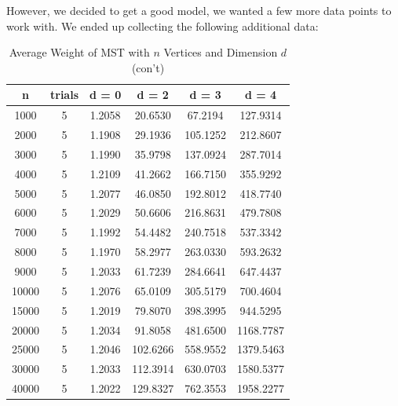 \documentclass[12pt]{article}
\begin{document}
However, we decided to get a good model, we wanted a few more data points to work with. We ended up collecting the following additional data:

\begin{table}[h!]
\centering
\caption{Average Weight of MST with $n$ Vertices and Dimension $d$ (con't)}
\begin{tabular} {c | c | c | c | c | c  }
n&trials&d = 0&d = 2&d = 3&d = 4\\ \hline
1000&5&1.2058&20.6530&67.2194&127.9314\\
2000&5&1.1908&29.1936&105.1252&212.8607\\
3000&5&1.1990&35.9798&137.0924&287.7014\\
4000&5&1.2109&41.2662&166.7150&355.9292\\
5000&5&1.2077&46.0850&192.8012&418.7740\\
6000&5&1.2029&50.6606&216.8631&479.7808\\
7000&5&1.1992&54.4482&240.7518&537.3342\\
8000&5&1.1970&58.2977&263.0330&593.2632\\
9000&5&1.2033&61.7239&284.6641&647.4437\\
10000&5&1.2076&65.0109&305.5179&700.4604\\
15000&5&1.2019&79.8070&398.3995&944.5295\\
20000&5&1.2034&91.8058&481.6500&1168.7787\\
25000&5&1.2046&102.6266&558.9552&1379.5463\\
30000&5&1.2033&112.3914&630.0703&1580.5377\\
40000&5&1.2022&129.8327&762.3553&1958.2277\\
\end{tabular}
\label{table:2}
\end{table}

\pagebreak
\end{document}
